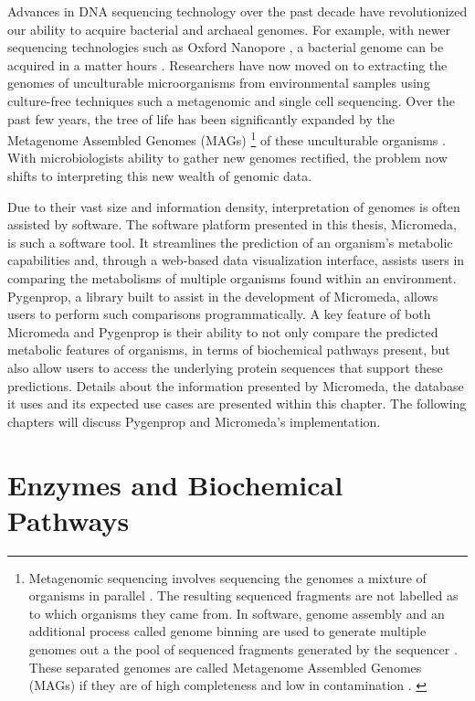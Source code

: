 Advances in DNA sequencing technology over the past decade have revolutionized our ability to acquire bacterial and archaeal genomes. For example, with newer sequencing technologies such as Oxford Nanopore \cite{jain2016oxford}, a bacterial genome can be acquired in a matter hours \cite{Lu2016,Cao2017}. Researchers have now moved on to extracting the genomes of unculturable microorganisms from environmental samples using culture-free techniques such a metagenomic \cite{quince2017shotgun} and single cell \cite{gawad2016single} sequencing. Over the past few years, the tree of life has been significantly expanded by the Metagenome Assembled Genomes (MAGs) \footnote{Metagenomic sequencing involves sequencing the genomes a mixture of organisms in parallel \cite{quince2017shotgun}. The resulting sequenced fragments are not labelled as to which organisms they came from. In software, genome assembly and an additional process called genome binning are used to generate multiple genomes out a the pool of sequenced fragments generated by the sequencer \cite{quince2017shotgun, sangwan2016recovering}. These separated genomes are called Metagenome Assembled Genomes (MAGs) if they are of high completeness and low in contamination \cite{sangwan2016recovering}. \label{metagenomics-footnote}} of these unculturable organisms \cite{Hug2016,Parks2017}. With microbiologists ability to gather new genomes rectified, the problem now shifts to interpreting this new wealth of genomic data. 

Due to their vast size and information density, interpretation of genomes is often assisted by software. The software platform presented in this thesis, Micromeda, is such a software tool. It streamlines the prediction of an organism's metabolic capabilities and, through a web-based data visualization interface, assists users in comparing the metabolisms of multiple organisms found within an environment. Pygenprop, a library built to assist in the development of Micromeda, allows users to perform such comparisons programmatically. A key feature of both Micromeda and Pygenprop is their ability to not only compare the predicted metabolic features of organisms, in terms of biochemical pathways present, but also allow users to access the underlying protein sequences that support these predictions. Details about the information presented by Micromeda, the database it uses and its expected use cases are presented within this chapter. The following chapters will discuss Pygenprop and Micromeda's implementation.

\section{Enzymes and Biochemical Pathways}

